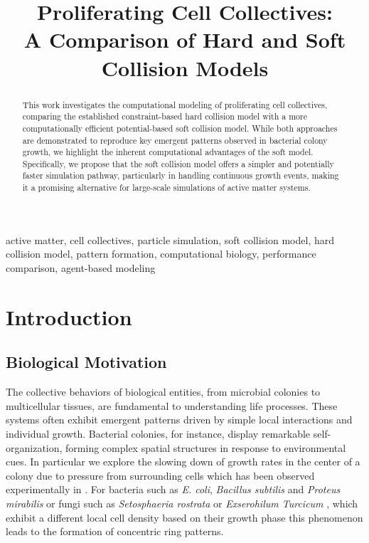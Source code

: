 \documentclass[conference]{IEEEtran}
\begin{document}
\title{Proliferating Cell Collectives: \\A Comparison of Hard and Soft Collision Models}

\author{
}

\maketitle

\begin{abstract}
    This work investigates the computational modeling of proliferating cell collectives, comparing the established constraint-based hard collision model\cite{Weady2024} with a more computationally efficient potential-based soft collision model. While both approaches are demonstrated to reproduce key emergent patterns observed in bacterial colony growth, we highlight the inherent computational advantages of the soft model. Specifically, we propose that the soft collision model offers a simpler and potentially faster simulation pathway, particularly in handling continuous growth events, making it a promising alternative for large-scale simulations of active matter systems.

\end{abstract}

\begin{IEEEkeywords}
    active matter, cell collectives, particle simulation, soft collision model, hard collision model, pattern formation, computational biology, performance comparison, agent-based modeling
\end{IEEEkeywords}

\section{Introduction}
\subsection{Biological Motivation}

The collective behaviors of biological entities, from microbial colonies to multicellular tissues, are fundamental to understanding life processes. These systems often exhibit emergent patterns driven by simple local interactions and individual growth. Bacterial colonies, for instance, display remarkable self-organization, forming complex spatial structures in response to environmental cues. In particular we explore the slowing down of growth rates in the center of a colony due to pressure from surrounding cells which has been observed experimentally in \cite{Wittmann2023}. For bacteria such as \textit{E. coli}, \textit{Bacillus subtilis} and \textit{Proteus mirabilis} or fungi such as \textit{Setosphaeria rostrata} or \textit{Exserohilum Turcicum }, which exhibit a different local cell density based on their growth phase this phenomenon leads to the formation of concentric ring patterns\cite{YAMAZAKI2005136}.
\end{document}
